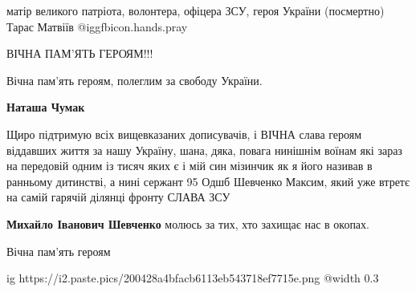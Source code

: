 \begin{itemize}
матір великого патріота, волонтера, офіцера ЗСУ, героя України (посмертно) Тарас Матвіїв
 @igg{fbicon.hands.pray} 

ВІЧНА ПАМ'ЯТЬ ГЕРОЯМ!!!

Вічна пам'ять героям, полеглим за свободу України.

\begin{itemize} %
\textbf{Наташа Чумак} 

Щиро підтримую всіх вищевказаних дописувачів, і ВІЧНА слава героям віддавших
життя за нашу Україну, шана, дяка, повага нинішнім воїнам які зараз на передовій
одним із тисяч яких є і мій син мізинчик як я його називав в ранньому
дитинстві, а нині сержант 95 Одшб Шевченко Максим, який уже втретє на самій
гарячій ділянці фронту СЛАВА ЗСУ

\textbf{Михайло Іванович Шевченко} молюсь за тих, хто захищає нас в окопах.
\end{itemize} %

Вічна пам'ять героям

\ifcmt
  ig https://i2.paste.pics/200428a4bfacb6113eb543718ef7715e.png
  @width 0.3
\fi

\end{itemize} %
